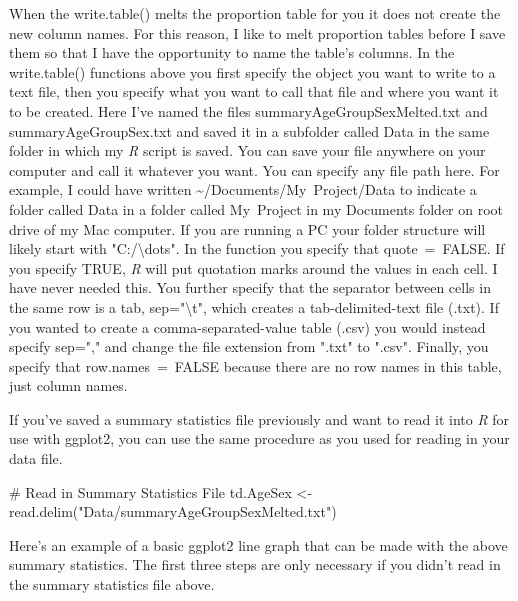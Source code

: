\documentclass[
  10pt,
  letterpaper]{article}
\newenvironment{Shaded}{\begin{snugshade}}{\end{snugshade}}
\newcommand{\CommentTok}[1]{\textcolor[rgb]{0.37,0.37,0.37}{#1}}
\newcommand{\FunctionTok}[1]{\textcolor[rgb]{0.28,0.35,0.67}{#1}}
\newcommand{\NormalTok}[1]{\textcolor[rgb]{0.00,0.23,0.31}{#1}}
\newcommand{\OtherTok}[1]{\textcolor[rgb]{0.00,0.23,0.31}{#1}}
\newcommand{\StringTok}[1]{\textcolor[rgb]{0.13,0.47,0.30}{#1}}
\renewcommand\texttt[1]{{\ttfamily\color{BrickRed}#1}}
\begin{document}
When the \texttt{write.table()} melts the proportion table for you it
does not create the new column names. For this reason, I like to melt
proportion tables before I save them so that I have the opportunity to
name the table's columns. In the \texttt{write.table()} functions above
you first specify the object you want to write to a text file, then you
specify what you want to call that file and where you want it to be
created. Here I've named the files \texttt{summaryAgeGroupSexMelted.txt}
and \texttt{summaryAgeGroupSex.txt} and saved it in a subfolder called
\texttt{Data} in the same folder in which my \emph{R} script is saved.
You can save your file anywhere on your computer and call it whatever
you want. You can specify any file path here. For example, I could have
written \texttt{\textasciitilde{}/Documents/My\ Project/Data} to
indicate a folder called \texttt{Data} in a folder called
\texttt{My\ Project} in my \texttt{Documents} folder on root drive of my
Mac computer. If you are running a PC your folder structure will likely
start with \texttt{"C:/\textbackslash{}dots"}. In the function you
specify that \texttt{quote\ =\ FALSE}. If you specify \texttt{TRUE},
\emph{R} will put quotation marks around the values in each cell. I have
never needed this. You further specify that the separator between cells
in the same row is a tab, \texttt{sep="\textbackslash{}t"}, which
creates a tab-delimited-text file (.txt). If you wanted to create a
comma-separated-value table (.csv) you would instead specify
\texttt{sep=","} and change the file extension from \texttt{".txt"} to
\texttt{".csv"}. Finally, you specify that \texttt{row.names\ =\ FALSE}
because there are no row names in this table, just column names.

If you've saved a summary statistics file previously and want to read it
into \emph{R} for use with \texttt{ggplot2}, you can use the same
procedure as you used for reading in your data file.

\begin{Shaded}
\begin{Highlighting}[]
\CommentTok{\# Read in Summary Statistics File}
\NormalTok{td.AgeSex }\OtherTok{\textless{}{-}} \FunctionTok{read.delim}\NormalTok{(}\StringTok{"Data/summaryAgeGroupSexMelted.txt"}\NormalTok{)}
\end{Highlighting}
\end{Shaded}

Here's an example of a basic \texttt{ggplot2} line graph that can be
made with the above summary statistics. The first three steps are only
necessary if you didn't read in the summary statistics file above.
\end{document}

